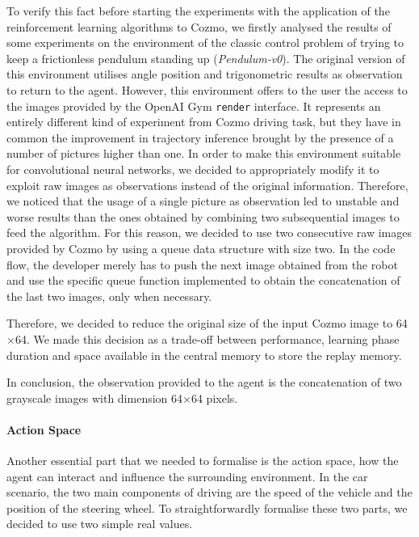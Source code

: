 To verify this fact before starting the experiments with the application of the reinforcement learning algorithms to Cozmo, we firstly analysed the results of some experiments on the environment of the classic control problem of trying to keep a frictionless pendulum standing up (\textit{Pendulum-v0}).
The original version of this environment utilises angle position and trigonometric results as observation to return to the agent.
However, this environment offers to the user the access to the images provided by the OpenAI Gym \texttt{render} interface.
It represents an entirely different kind of experiment from Cozmo driving task, but they have in common the improvement in trajectory inference brought by the presence of a number of pictures higher than one.
In order to make this environment suitable for convolutional neural networks, we decided to appropriately modify it to exploit raw images as observations instead of the original information.
Therefore, we noticed that the usage of a single picture as observation led to unstable and worse results than the ones obtained by combining two subsequential images to feed the algorithm.
For this reason, we decided to use two consecutive raw images provided by Cozmo by using a queue data structure with size two.
In the code flow, the developer merely has to push the next image obtained from the robot and use the specific queue function implemented to obtain the concatenation of the last two images, only when necessary.

Therefore, we decided to reduce the original size of the input Cozmo image to 64$\times$64.
We made this decision as a trade-off between performance, learning phase duration and space available in the central memory to store the replay memory.

In conclusion, the observation provided to the agent is the concatenation of two grayscale images with dimension 64$\times$64 pixels.

\paragraph{Action Space}

Another essential part that we needed to formalise is the action space, how the agent can interact and influence the surrounding environment.
In the car scenario, the two main components of driving are the speed of the vehicle and the position of the steering wheel.
To straightforwardly formalise these two parts, we decided to use two simple real values.


